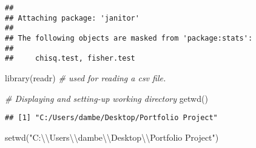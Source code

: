 \documentclass[
]{article}
\newenvironment{Shaded}{\begin{snugshade}}{\end{snugshade}}
\newcommand{\CommentTok}[1]{\textcolor[rgb]{0.56,0.35,0.01}{\textit{#1}}}
\newcommand{\FunctionTok}[1]{\textcolor[rgb]{0.00,0.00,0.00}{#1}}
\newcommand{\NormalTok}[1]{#1}
\newcommand{\SpecialCharTok}[1]{\textcolor[rgb]{0.00,0.00,0.00}{#1}}
\newcommand{\StringTok}[1]{\textcolor[rgb]{0.31,0.60,0.02}{#1}}
\begin{document}
\begin{verbatim}
## 
## Attaching package: 'janitor'
## 
## The following objects are masked from 'package:stats':
## 
##     chisq.test, fisher.test
\end{verbatim}

\begin{Shaded}
\begin{Highlighting}[]
\FunctionTok{library}\NormalTok{(readr) }\CommentTok{\# used for reading a csv file.}
\end{Highlighting}
\end{Shaded}

\begin{Shaded}
\begin{Highlighting}[]
\CommentTok{\# Displaying and setting{-}up working directory}
\FunctionTok{getwd}\NormalTok{()}
\end{Highlighting}
\end{Shaded}

\begin{verbatim}
## [1] "C:/Users/dambe/Desktop/Portfolio Project"
\end{verbatim}

\begin{Shaded}
\begin{Highlighting}[]
\FunctionTok{setwd}\NormalTok{(}\StringTok{"C:}\SpecialCharTok{\textbackslash{}\textbackslash{}}\StringTok{Users}\SpecialCharTok{\textbackslash{}\textbackslash{}}\StringTok{dambe}\SpecialCharTok{\textbackslash{}\textbackslash{}}\StringTok{Desktop}\SpecialCharTok{\textbackslash{}\textbackslash{}}\StringTok{Portfolio Project"}\NormalTok{)}
\end{Highlighting}
\end{Shaded}
\end{document}

